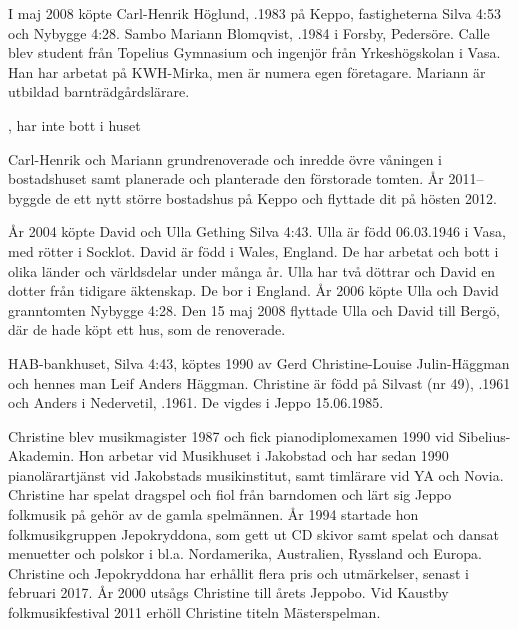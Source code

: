 I maj 2008 köpte Carl-Henrik Höglund, .1983 på Keppo, fastigheterna Silva 4:53 och Nybygge 4:28. Sambo Mariann Blomqvist, .1984 i Forsby, Pedersöre. Calle blev student från Topelius Gymnasium och ingenjör från Yrkeshögskolan i Vasa. Han har arbetat på KWH-Mirka, men är numera egen företagare. Mariann är utbildad barnträdgårdslärare.
\begin{jhchildren}
  \item {}
  \item {}
  \item {}, har inte bott i huset
\end{jhchildren}
Carl-Henrik och Mariann grundrenoverade och inredde övre våningen i bostadshuset samt planerade och planterade den förstorade tomten. År 2011-- byggde de ett nytt större bostadshus på Keppo och flyttade dit på hösten 2012.


År 2004 köpte David och Ulla Gething Silva 4:43. Ulla är född 06.03.1946 i Vasa, med rötter i Socklot. David är född i Wales, England. De har arbetat och bott i olika länder och världsdelar under många år. Ulla har två döttrar och David en dotter från tidigare äktenskap. De bor i England. År 2006 köpte Ulla och David granntomten Nybygge 4:28. Den 15 maj 2008 flyttade Ulla och David till Bergö, där de hade köpt ett hus, som de renoverade.


HAB-bankhuset, Silva 4:43, köptes 1990 av Gerd Christine-Louise Julin-Häggman och hennes man Leif Anders Häggman. Christine är född på Silvast (nr 49), .1961 och Anders i Nedervetil, .1961. De vigdes i Jeppo 15.06.1985.

Christine blev musikmagister 1987 och fick pianodiplomexamen 1990 vid Sibelius-Akademin. Hon arbetar vid Musikhuset i Jakobstad och har sedan 1990 pianolärartjänst vid Jakobstads musikinstitut, samt timlärare vid YA och Novia. Christine har spelat dragspel och fiol från barndomen och lärt sig Jeppo folkmusik på gehör av de gamla spelmännen. År 1994 startade hon folkmusikgruppen Jepokryddona, som gett ut CD skivor samt spelat och dansat menuetter och polskor i bl.a. Nordamerika, Australien, Ryssland och Europa. Christine och Jepokryddona har erhållit flera pris och utmärkelser, senast i februari 2017. År 2000 utsågs Christine till årets Jeppobo. Vid Kaustby folkmusikfestival 2011 erhöll Christine titeln Mästerspelman.

